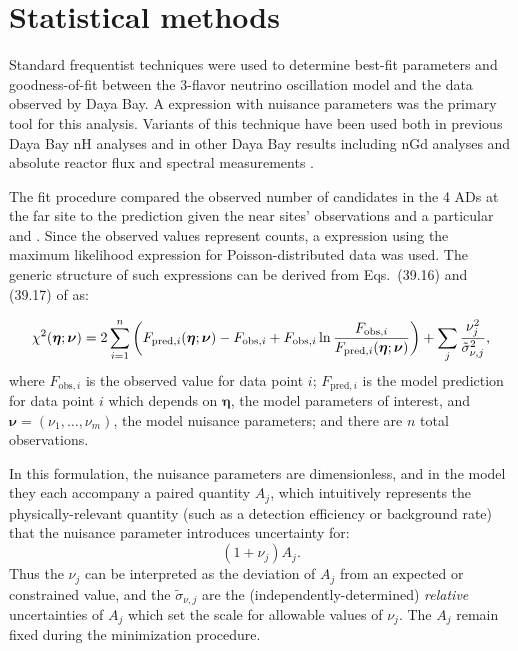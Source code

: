 \section{Statistical methods}
\label{sec:fitter}

Standard frequentist techniques were used to determine best-fit parameters
and goodness-of-fit between the 3-flavor neutrino oscillation model
and the data observed by Daya Bay.
A \chisquare{} expression with nuisance parameters
was the primary tool for this analysis.
Variants of this technique have been used both in previous Daya Bay nH analyses
and in other Daya Bay results including nGd \thetaot{} analyses
and absolute reactor \nuebar{} flux and spectral measurements
\cite{nh2016,ngd2016,reactorflux2017,extractionreactorflux2019}.

The fit procedure compared the observed number of \nuebar{} candidates
in the 4 ADs at the far site to the prediction
given the near sites' observations and a particular \thetaot{} and \dmee{}.
Since the observed values represent counts,
a \chisquare{} expression using the maximum likelihood expression
for Poisson-distributed data was used.
The generic structure of such \chisquare{} expressions
can be derived from Eqs.~(39.16) and (39.17) of \cite{pdg} as:

\begin{equation}
    \label{eq:chisquare_generic}
    \chi^2(\boldsymbol{\eta};\boldsymbol{\nu}) = 2\sum_{i=1}^{n} \left(
        F_{\text{pred},i}(\boldsymbol{\eta};\boldsymbol{\nu}) - F_{\text{obs},i}
        + F_{\text{obs},i}\ln
        \frac{F_{\text{obs},i}}{F_{\text{pred},i}(\boldsymbol{\eta};\boldsymbol{\nu})}
        \right)
        +
        \sum_j \frac{\nu_j^2}{\tilde{\sigma}_{\nu,j}^2},
\end{equation}
where $F_{\text{obs},i}$ is the observed value for data point $i$;
$F_{\text{pred},i}$
is the model prediction for data point $i$
which depends on $\boldsymbol{\eta}$, the model parameters of interest,
and $\boldsymbol{\nu}=(\nu_1, \ldots, \nu_m)$,
the model nuisance parameters;
and there are $n$ total observations.

In this formulation, the nuisance parameters are dimensionless,
and in the model they each accompany a paired quantity $A_j$,
which intuitively represents the physically-relevant quantity
(such as a detection efficiency or background rate)
that the nuisance parameter introduces uncertainty for:
\begin{equation}
    (1+\nu_j)A_j.
\end{equation}
Thus the $\nu_j$ can be interpreted as the deviation of $A_j$
from an expected or constrained value,
and the $\tilde{\sigma}_{\nu,j}$ are the (independently-determined)
\emph{relative} uncertainties of $A_j$
which set the scale for allowable values of $\nu_j$.
The $A_j$ remain fixed during the minimization procedure.

